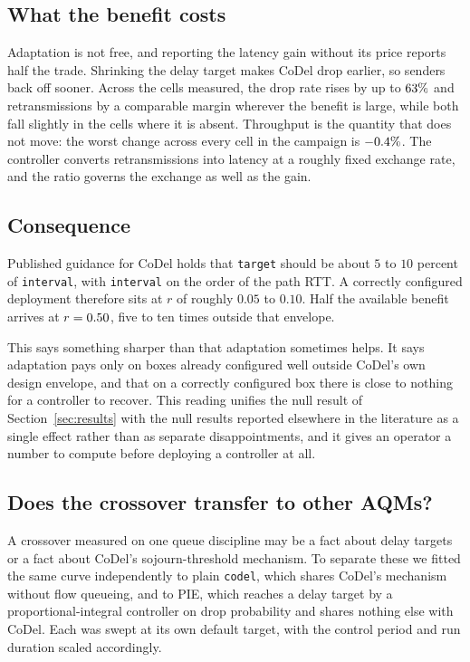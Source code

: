 \subsection{What the benefit costs}

Adaptation is not free, and reporting the latency gain without its price
reports half the trade. Shrinking the delay target makes CoDel drop earlier, so
senders back off sooner. Across the cells measured, the drop rate rises by up
to $63\%$ and retransmissions by a comparable margin wherever the
benefit is large, while both fall slightly in the cells where it is absent.
Throughput is the quantity that does not move: the worst change across every
cell in the campaign is $-0.4\%$. The controller converts
retransmissions into latency at a roughly fixed exchange rate, and the ratio
governs the exchange as well as the gain.

\subsection{Consequence}

Published guidance for CoDel holds that \texttt{target} should be about $5$ to
$10$ percent of \texttt{interval}, with \texttt{interval} on the order of the
path RTT. A correctly configured deployment therefore sits at $r$ of roughly
$0.05$ to $0.10$. Half the available benefit arrives at $r = 0.50$,
five to ten times outside that envelope.

This says something sharper than that adaptation sometimes helps.
It says adaptation pays only on boxes already configured well outside CoDel's
own design envelope, and that on a correctly configured box there is close to
nothing for a controller to recover. This reading unifies the null result of
Section~\ref{sec:results} with the null results reported elsewhere in the
literature as a single effect rather than as separate disappointments, and it
gives an operator a number to compute before deploying a controller at all.

\subsection{Does the crossover transfer to other AQMs?}
\label{sec:law:transfer}

A crossover measured on one queue discipline may be a fact about delay
targets or a fact about CoDel's sojourn-threshold mechanism. To separate
these we fitted the same curve independently to plain \texttt{codel}, which
shares CoDel's mechanism without flow queueing, and to PIE, which reaches a
delay target by a proportional-integral controller on drop probability and
shares nothing else with CoDel. Each was swept at its own default target, with
the control period and run duration scaled accordingly.

